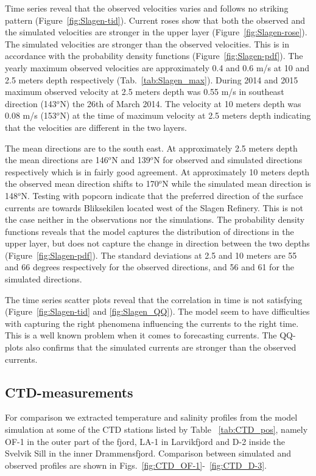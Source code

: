 Time series reveal that the observed velocities varies and follows no striking pattern (Figure~\ref{fig:Slagen-tid}). Current roses show that both the observed and the simulated velocities are stronger in the upper layer (Figure~\ref{fig:Slagen-rose}). The simulated velocities are stronger than the observed velocities. This is in accordance with the probability density functions (Figure~\ref{fig:Slagen-pdf}). The yearly maximum observed velocities are approximately 0.4 and 0.6 m/s at 10 and 2.5 meters depth respectively (Tab.~\ref{tab:Slagen_max}). During 2014 and 2015 maximum observed velocity at 2.5 meters depth was 0.55 m/s in southeast direction (143$^o$N) the 26th of March 2014. The velocity at 10 meters depth was 0.08 m/s (153$^o$N) at the time of maximum velocity at 2.5 meters depth indicating that the velocities are different in the two layers.

The mean directions are to the south east. At approximately 2.5 meters depth the mean directions are 146$^o$N and 139$^o$N for observed and simulated directions respectively which is in fairly good agreement. At approximately 10 meters depth the observed mean direction shifts to 170$^o$N while the simulated mean direction is 148$^o$N. Testing with popcorn indicate that the preferred direction of the surface currents are towards Bliksekilen located west of the Slagen Refinery. This is not the case neither in the observations nor the simulations. The probability density functions reveals that the model captures the distribution of directions in the upper layer, but does not capture the change in direction between the two depths (Figure~\ref{fig:Slagen-pdf}). The standard deviations at 2.5 and 10 meters are 55 and 66 degrees respectively for the observed directions, and 56 and 61 for the simulated directions.

The time series scatter plots reveal that the correlation in time is not satisfying (Figure~\ref{fig:Slagen-tid} and \ref{fig:Slagen_QQ}). The model seem to have difficulties with capturing the right phenomena influencing the currents to the right time. This is a well known problem when it comes to forecasting currents. The QQ-plots also confirms that the simulated currents are stronger than the observed currents. 

\clearpage
\subsection{CTD-measurements}
\label{subsec:CTDe}
For comparison we extracted temperature and salinity profiles from the model simulation at some of the CTD stations listed by Table ~\ref{tab:CTD_pos}, namely OF-1 in the outer part of the fjord, LA-1 in Larvikfjord and D-2 inside the Svelvik Sill in the inner Drammensfjord. Comparison between simulated and observed profiles are shown in Figs.~\ref{fig:CTD_OF-1}-~\ref{fig:CTD_D-3}. 

